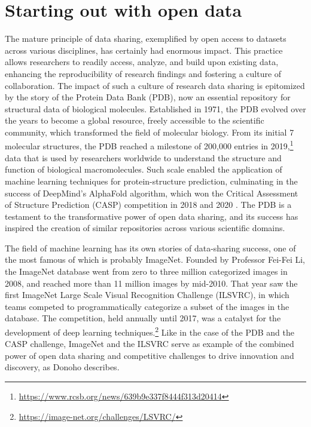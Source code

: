 \documentclass[]{hdsr}
\begin{document}
\section*{Starting out with open data}

The mature principle of data sharing, exemplified by open access to datasets across various disciplines, has certainly had enormous impact. This practice allows researchers to readily access, analyze, and build upon existing data, enhancing the reproducibility of research findings and fostering a culture of collaboration.
The impact of such a culture of research data sharing is epitomized by the story of the Protein Data Bank (PDB), now an essential repository for structural data of biological molecules. Established in 1971, the PDB evolved over the years to become a global resource, freely accessible to the scientific community, which transformed the field of molecular biology. From its initial 7 molecular structures, the PDB reached a milestone of 200,000 entries in 2019,\footnote{\url{https://www.rcsb.org/news/639b9e337f8444f313d20414}} data that is used by researchers worldwide to understand the structure and function of biological macromolecules. Such scale enabled the application of machine learning techniques for protein-structure prediction, culminating in the success of DeepMind's AlphaFold algorithm, which won the Critical Assessment of Structure Prediction (CASP) competition in 2018 and 2020 \citep{jumper2021highly}. The PDB is a testament to the transformative power of open data sharing, and its success has inspired the creation of similar repositories across various scientific domains.

The field of machine learning has its own stories of data-sharing success, one of the most famous of which is probably ImageNet. Founded by Professor Fei-Fei Li, the ImageNet database went from zero to three million categorized images in 2008, and reached more than 11 million images by mid-2010. That year saw the first ImageNet Large Scale Visual Recognition Challenge (ILSVRC), in which teams competed to programmatically categorize a subset of the images in the database. The competition, held annually until 2017, was a catalyst for the development of deep learning techniques.\footnote{\url{https://image-net.org/challenges/LSVRC/}} Like in the case of the PDB and the CASP challenge, ImageNet and the ILSVRC serve as example of the combined power of open data sharing and competitive challenges to drive innovation and discovery, as Donoho describes.
\end{document}
